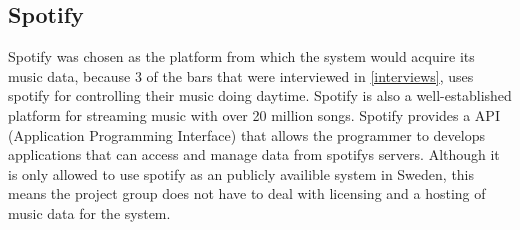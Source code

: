 \subsection{Spotify}
\label{sub:spotify}
Spotify was chosen as the platform from which the system would acquire its music data, because 3 of the bars that were interviewed in \cref{interviews}, uses spotify for controlling their music doing daytime. Spotify is also a well-established platform for streaming music with over 20 million songs. 
 Spotify provides a API (Application Programming Interface) that allows the programmer to develops applications that can access and manage data from spotifys servers.
Although it is only allowed to use spotify as an publicly availible system in Sweden, this means the project group does not have to deal with licensing and a hosting of music data for the system.
